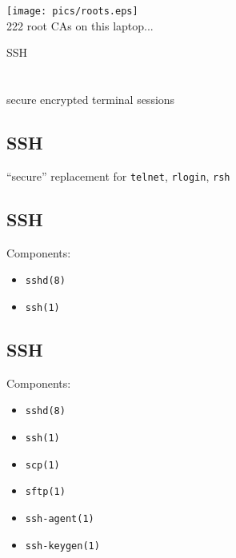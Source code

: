 \documentclass[xga]{xdvislides}
\begin{document}
\begin{center}
	\texttt{[image: pics/roots.eps]} \\
	222 root CAs on this laptop...
\end{center}




\newpage
\vspace*{\fill}
\begin{center}
	\Hugesize
		SSH\\ [1em]
	\hspace*{5mm}
	\blueline\\
	\hspace*{5mm}\\
		secure encrypted terminal sessions
\end{center}
\vspace*{\fill}

\subsection{SSH}
\vspace{.5in}
\begin{center}
	\Huge
	``secure'' replacement for \verb+telnet+, \verb+rlogin+, \verb+rsh+
\end{center}
\Normalsize

\subsection{SSH}
Components:
\begin{itemize}
	\item \verb+sshd(8)+
	\item \verb+ssh(1)+
\end{itemize}

\subsection{SSH}
Components:
\begin{itemize}
	\item \verb+sshd(8)+
	\item \verb+ssh(1)+
	\item \verb+scp(1)+
	\item \verb+sftp(1)+
	\item \verb+ssh-agent(1)+
	\item \verb+ssh-keygen(1)+
\end{itemize}
\end{document}
